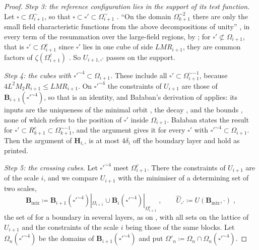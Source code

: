 \documentclass[11pt]{preprint}
\numberwithin{equation}{section}
\theoremstyle{definition}
\theoremstyle{remark}
\theoremstyle{plain}
\begin{document}
\begin{proof}
\emph{Step 3: the reference configuration lies in the support of its test function.} Let $\square \subset \Omega_{i+1}^\sim$, so that $\square \subset \square' \subset \Omega_{i+1}^\sim$ \cite[p.~266]{BalabanCRE}. ``On the domain $\Omega_{k+1}^{\sim2}$ there are only the small field characteristic functions from the above decompositions of unity'' \cite[p.~265]{BalabanCRE}, in every term of the resummation over the large-field regions, by \cite[(3.5), p.~265]{BalabanCRE}; for $\square' \not\subset \Omega_{i+1}$, that is $\square' \subset \Omega_{i+1}^c$ since $\square'$ lies in one cube of side $LMR_{i+1}$, they are common factors of $\zeta(\Omega_{i+1}^c)$ \cite[p.~267]{BalabanCRE}. So $U_{i+1,\square'}$ passes \cite[(3.2)]{BalabanCRE} on the support.

\emph{Step 4: the cubes with $\square'^{\sim4} \subset \Omega_{i+1}$.} These include all $\square' \subset \Omega_{i+1}^{\sim-1}$, because $4L^2M_2R_{i+1} \leq LMR_{i+1}$. On $\square'^{\sim4}$ the constraints of $U_{i+1}$ are those of $\mathbf B_{i+1}(\square'^{\sim4})$, so that \cite[(3.17), p.~268]{BalabanCRE} is an identity, and Ba{\l}aban's derivation of \cite[(3.19)]{BalabanCRE} applies: its inputs are the uniqueness of the minimal orbit \cite[Theorem~1, p.~279]{BalabanVAR}, the decay \cite[(190), p.~308]{BalabanVAR}, and the bounds \cite[(106)--(108), p.~33; (159)--(163), p.~42]{BalabanAVG}, none of which refers to the position of $\square'$ inside $\Omega_{i+1}$. Ba{\l}aban states the result for $\square' \subset R_{k+1}^c \subset \Omega_{k+1}^{\sim-1}$, and the argument gives it for every $\square'$ with $\square'^{\sim4} \subset \Omega_{i+1}$. Then the argument of $\mathbf H_{i,\square}$ is at most $4\delta_i$ off the boundary layer and \cite[(3.7)--(3.8)]{BalabanCRE} hold as printed.

\emph{Step 5: the crossing cubes.} Let $\square'^{\sim4}$ meet $\Omega_{i+1}^c$. There the constraints of $U_{i+1}$ are of the scale $i$, and we compare $U_{i+1}$ with the minimiser of a determining set of two scales,
\begin{equation}\label{eq:mixed-set}
    \mathbf B_{\mathrm{mix}} \coloneqq \mathbf B_{i+1}(\square'^{\sim4})|_{\Omega_{i+1}} \cup \mathbf B_i(\square'^{\sim4})|_{\Omega_{i+1}^c}\;,
    \qquad
    \hat U_{\square'} \coloneqq U(\mathbf B_{\mathrm{mix}}, \cdot)\;,
\end{equation}
the set of \cite[(2.14), p.~257]{BalabanCRE} for a boundary in several layers, as on \cite[p.~269]{BalabanCRE}, with all sets on the lattice of $U_{i+1}$ and the constraints of the scale $i$ being those of the same blocks. Let $\Omega_n(\square'^{\sim4})$ be the domains of $\mathbf B_{i+1}(\square'^{\sim4})$ \cite[p.~256]{BalabanCRE} and put $\Omega'_n \coloneqq \Omega_n \cap \Omega_n(\square'^{\sim4})$.


\end{proof}
\end{document}
